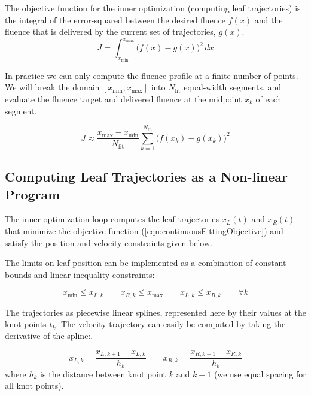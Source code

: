 \documentclass[12pt]{article}
\begin{document}
The objective function for the inner optimization (computing leaf trajectories)
is the integral of the error-squared between the desired fluence $f(x)$ and the fluence that
is delivered by the current set of trajectories, $g(x)$.
\begin{equation}
  J = \int_{x_\text{min}}^{x_\text{max}} \! \bigg( f(x) - g(x) \bigg)^2 \,dx
  \label{eqn:continuousFittingObjective}
\end{equation}

In practice we can only compute the fluence profile at a finite number of points. We will break the domain $[x_\text{min}, x_\text{max}]$ into $N_\text{fit}$ equal-width segments,
and evaluate the fluence target and delivered fluence at the midpoint $x_k$ of each segment.

\begin{equation}
  J \approx \frac{x_\text{max} - x_\text{min}}{N_\text{fit}}
  \sum_{k = 1}^{N_\text{fit}} \! \bigg( f(x_k) - g(x_k) \bigg)^2
  \label{eqn:discreteFittingObjective}
\end{equation}

\subsection{Computing Leaf Trajectories as a Non-linear Program}
\label{sec:LeafTrajectoryAsNLP}

The inner optimization loop computes the leaf trajectories $x_L(t)$ and $x_R(t)$
that minimize the objective function (\ref{eqn:continuousFittingObjective})
and satisfy the position and velocity constraints given below.

The limits on leaf position can be implemented as a combination of
constant bounds and linear inequality constraints:

\begin{equation}
  x_\text{min} \leq x_{L, k}
  \quad \quad
  x_{R, k} \leq x_\text{max}
  \quad \quad
  x_{L, k} \leq x_{R, k}
  \quad \quad
  \forall k
  \label{eqn:PositionLimits}
\end{equation}

The trajectories as piecewise linear splines, represented here by their values at the knot points $t_k$.
The velocity trajectory can easily be computed by taking the derivative of the spline:.

\begin{equation}
  \dot{x}_{L, k} = \frac{x_{L, k+1} - x_{L, k}}{h_k}
  \quad \quad
  \dot{x}_{R, k} = \frac{x_{R, k+1} - x_{R, k}}{h_k}
\end{equation}
\noindent where $h_k$ is the distance between knot point $k$ and $k+1$ (we use equal spacing for all knot points).
\end{document}
